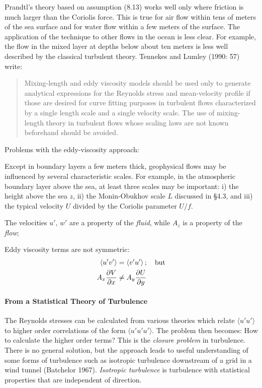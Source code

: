 Prandtl's theory based on assumption (8.13) works well only where
friction is much larger than the Coriolis force. This is true for air
flow within tens of meters of the sea surface and for water flow
within a few meters of the surface. The application of the technique
to other flows in the ocean is less clear. For example, the flow in
the mixed layer at depths below about ten
meters is less well described by the classical turbulent
theory. Tennekes and Lumley (1990: 57) write:
\begin{quotation} \small
Mixing-length and eddy viscosity models should be used only to
generate analytical expressions for the Reynolds stress and
mean-velocity profile if those are desired for curve fitting purposes
in turbulent flows characterized by a single length scale and a single
velocity scale. The use of mixing-length theory in turbulent flows whose scaling laws are not known
beforehand should be avoided.
\end{quotation}
Problems with the eddy-viscosity approach:
\begin{enumerate}
\vitem Except in boundary layers a few meters thick, geophysical flows
may be influenced by several characteristic scales. For example, in
the atmospheric boundary layer above the sea, at least three scales
may be important: i) the height above the sea $z$, ii) the
Monin-Obukhov scale $L$ discussed in \S4.3, and iii) the typical
velocity $U$ divided by the Coriolis parameter $U/f$.

\vitem The velocities $u',\,w'$ are a property of the \textit{fluid},
while $A_z$ is a property of the \textit{flow};

\vitem Eddy viscosity terms are not symmetric:
\begin{align}
\langle u'v' \rangle &= \langle v'u' \rangle\,;\quad \text{but} \notag \\
A_x \frac{\partial{V}}{\partial{x}} &\neq A_y \frac{\partial{U}}{\partial{y}}
\notag
\end{align}
\end{enumerate}

\paragraph{From a Statistical Theory of Turbulence}
The Reynolds stresses can be calculated from various theories which
relate $\langle u'u' \rangle$ to higher order correlations of the form
$\langle u'u'u' \rangle$. The problem then becomes: How to calculate
the higher order terms? This is the \textit{closure
  problem} in turbulence.  There is no general solution, but
the approach leads to useful understanding of some forms of turbulence
such as isotropic turbulence downstream of a grid in a wind tunnel
(Batchelor 1967). \textit{Isotropic turbulence} is turbulence
with statistical properties that are independent of direction.


